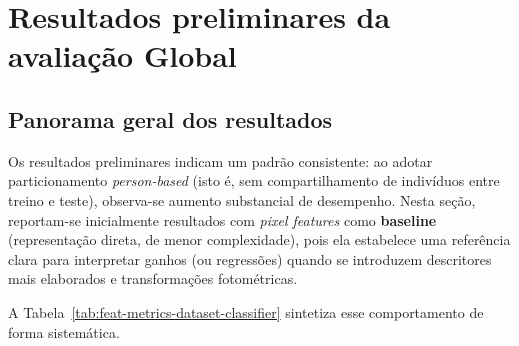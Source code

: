 \documentclass[12pt,a4paper]{article}
\begin{document}
\section{Resultados preliminares da avaliação Global}

\subsection{Panorama geral dos resultados}
Os resultados preliminares indicam um padrão consistente: ao adotar particionamento \textit{person-based} (isto é, sem compartilhamento de indivíduos entre treino e teste), observa-se aumento substancial de desempenho. Nesta seção, reportam-se inicialmente resultados com \emph{pixel features} como \textbf{baseline} (representação direta, de menor complexidade), pois ela estabelece uma referência clara para interpretar ganhos (ou regressões) quando se introduzem descritores mais elaborados e transformações fotométricas.

A Tabela~\ref{tab:feat-metrics-dataset-classifier} sintetiza esse comportamento de forma sistemática.
\end{document}
